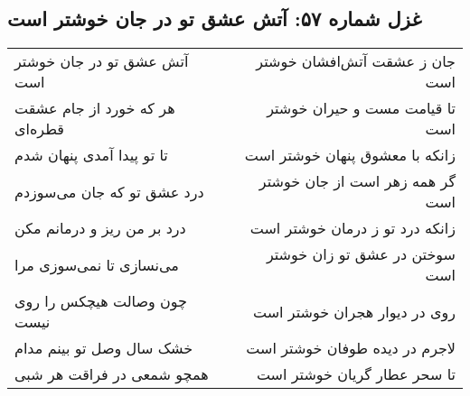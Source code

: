 \begin{center}
\section*{غزل شماره ۵۷: آتش عشق تو در جان خوشتر است}
\label{sec:057}
\begin{longtable}{l p{0.5cm} r}
آتش عشق تو در جان خوشتر است
&&
جان ز عشقت آتش‌افشان خوشتر است
\\
هر که خورد از جام عشقت قطره‌ای
&&
تا قیامت مست و حیران خوشتر است
\\
تا تو پیدا آمدی پنهان شدم
&&
زانکه با معشوق پنهان خوشتر است
\\
درد عشق تو که جان می‌سوزدم
&&
گر همه زهر است از جان خوشتر است
\\
درد بر من ریز و درمانم مکن
&&
زانکه درد تو ز درمان خوشتر است
\\
می‌نسازی تا نمی‌سوزی مرا
&&
سوختن در عشق تو زان خوشتر است
\\
چون وصالت هیچکس را روی نیست
&&
روی در دیوار هجران خوشتر است
\\
خشک سال وصل تو بینم مدام
&&
لاجرم در دیده طوفان خوشتر است
\\
همچو شمعی در فراقت هر شبی
&&
تا سحر عطار گریان خوشتر است
\\
\end{longtable}
\end{center}
